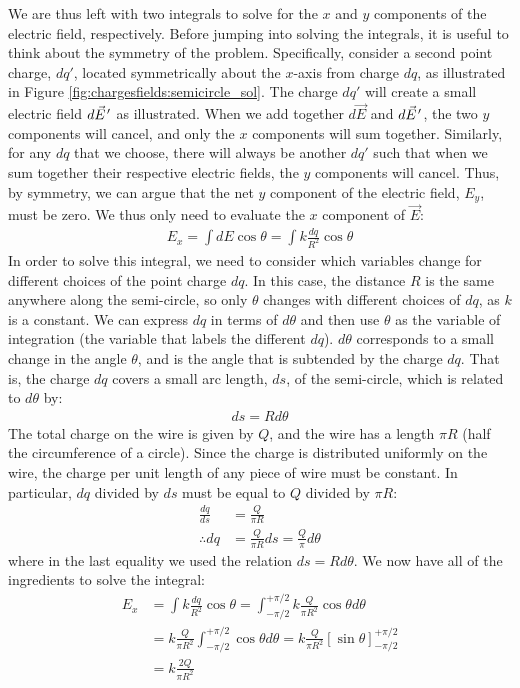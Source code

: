 We are thus left with two integrals to solve for the $x$ and $y$ components of the electric field, respectively. Before jumping into solving the integrals, it is useful to think about the symmetry of the problem. Specifically, consider a second point charge, $dq'$, located symmetrically about the $x$-axis from charge $dq$, as illustrated in Figure \ref{fig:chargesfields:semicircle_sol}. The charge $dq'$ will create a small electric field $d\pvec E'$ as illustrated. When we add together $d\vec E$ and $d\pvec E'$, the two $y$ components will cancel, and only the $x$ components will sum together. Similarly, for any $dq$ that we choose, there will always be another $dq'$ such that when we sum together their respective electric fields, the $y$ components will cancel. Thus, by symmetry, we can argue that the net $y$ component of the electric field, $E_y$, must be zero. We thus only need to evaluate the $x$ component of $\vec E$:
\begin{align*}
E_x = \int dE\cos\theta = \int k\frac{dq}{R^2} \cos\theta
\end{align*}
In order to solve this integral, we need to consider which variables change for different choices of the point charge $dq$. In this case, the distance $R$ is the same anywhere along the semi-circle, so only $\theta$ changes with different choices of $dq$, as $k$ is a constant. We can express $dq$ in terms of $d\theta$ and then use $\theta$ as the variable of integration (the variable that labels the different $dq$). $d\theta$ corresponds to a small change in the angle $\theta$, and is the angle that is subtended by the charge $dq$. That is, the charge $dq$ covers a small arc length, $ds$, of the semi-circle, which is related to $d\theta$ by:
\begin{align*}
ds = Rd\theta
\end{align*}
The total charge on the wire is given by $Q$, and the wire has a length $\pi R$ (half the circumference of a circle). Since the charge is distributed uniformly on the wire, the charge per unit length of any piece of wire must be constant. In particular, $dq$ divided by $ds$ must be equal to $Q$ divided by $\pi R$:
\begin{align*}
\frac{dq}{ds}&=\frac{Q}{\pi R}\\
\therefore dq &=\frac{Q}{\pi R}ds=\frac{Q}{\pi}d\theta
\end{align*}
where in the last equality we used the relation $ds=Rd\theta$. We now have all of the ingredients to solve the integral:
\begin{align*}
E_x &= \int k\frac{dq}{R^2} \cos\theta = \int_{-\pi/2}^{+\pi/2} k\frac{Q}{\pi R^2}\cos\theta d\theta\\
&= k\frac{Q}{\pi R^2}\int_{-\pi/2}^{+\pi/2}\cos\theta d\theta=k\frac{Q}{\pi R^2}\left[ \sin\theta \right]_{-\pi/2}^{+\pi/2}\\
&= k\frac{2Q}{\pi R^2}
\end{align*}
